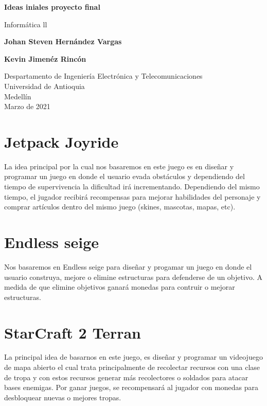 \documentclass{article}
\begin{document}
\begin{titlepage}
    \begin{center}
        \vspace*{1cm}
            
        \Huge
        \textbf{Ideas iniales proyecto final}
            
        \vspace{0.5cm}
        \LARGE
        Informática ll
            
        \vspace{1.5cm}
            
        \textbf{Johan Steven Hernández Vargas}
        
        \vspace{1.5cm}
        
        \textbf{Kevin Jimenéz Rincón}
            
        \vfill
            
        \vspace{0.8cm}
            
        \Large
        Despartamento de Ingeniería Electrónica y Telecomunicaciones\\
        Universidad de Antioquia\\
        Medellín\\
        Marzo de 2021
            
    \end{center}
\end{titlepage}
\tableofcontents
\newpage
\section{Jetpack Joyride }\label{intro}
La idea principal por la cual nos basaremos en este juego es en diseñar y programar un juego en donde el usuario evada obstáculos y dependiendo del tiempo de supervivencia la dificultad irá incrementando. Dependiendo del mismo tiempo, el jugador recibirá recompensas para mejorar habilidades del personaje y comprar artículos dentro del mismo juego (skines, mascotas, mapas, etc).
\section{Endless seige} \label{contenido}
Nos basaremos en Endless seige para diseñar y progamar un juego en donde el usuario construya, mejore o elimine estructuras para defenderse de un objetivo. A medida de que elimine objetivos ganará monedas para contruir o mejorar estructuras.
\section{StarCraft 2 Terran}
La principal idea de basarnos en este juego, es diseñar y programar un videojuego de mapa abierto el cual trata principalmente de recolectar recursos con una clase de tropa y con estos recursos generar más recolectores o soldados para atacar bases enemigas. Por ganar juegos, se recompensará al jugador con monedas para desbloquear nuevas o mejores tropas.
\end{document}
